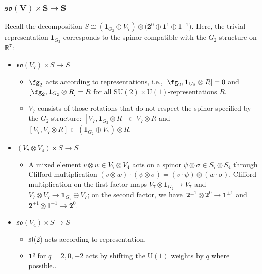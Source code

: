 \documentclass[10pt,a4paper]{amsart}
\numberwithin{equation}{section}
\theoremstyle{definition}
\def\R{\mathbb{R}}
\def\lie#1{\ensuremath{\mathfrak{#1}}}
\def\U{\ensuremath{\mathrm{U}}}
\def\SU{\ensuremath{\mathrm{SU}}}
\begin{document}
\subsubsection[so(V) times S longrightarrow S]{$\boldsymbol{\lie{so}(V) \times S \longrightarrow S}$}
Recall the decomposition
$
 S \cong (\textbf{1}_{G_2} \oplus V_7) \otimes \big(\textbf{2}^0 \oplus \textbf{1}^1 \oplus \textbf{1}^{-1}\big)$.
Here, the trivial representation $\textbf{1}_{G_2}$ corresponds to the spinor compatible with the $G_2$-structure on $\R^7$:
\begin{itemize}\itemsep=0pt
 \item[] \underline{$\lie{so}(V_7) \times S \longrightarrow S$}
 \begin{itemize}\itemsep=0pt
\item[--] $\fg_2$ acts according to representations, i.e., $[\fg_2 , \textbf{1}_{G_2} \otimes R] = 0$ and $[\fg_2 , \textbf{1}_{G_2} \otimes R] = R$ for all $\SU(2) \times \U(1)$-representations $R$.
\item[--] $V_7$ consists of those rotations that do not respect the spinor specified by the $G_2$-structure: $[V_7, \textbf{1}_{G_2} \otimes R] \subset V_7 \otimes R$ and $[V_7, V_7 \otimes R] \subset (\textbf{1}_{G_2} \oplus V_7) \otimes R$.
 \end{itemize}
 \item[] \underline{$(V_7 \otimes V_4) \times S \longrightarrow S$}
 \begin{itemize}\itemsep=0pt
\item[--] A mixed element $v \otimes w \in V_7 \otimes V_4$ acts on a spinor $\psi \otimes \sigma \in S_7 \otimes S_4$ through Clifford multiplication $(v \otimes w) \cdot (\psi \otimes \sigma) = (v \cdot \psi) \otimes (w \cdot \sigma)$. Clifford multiplication on the first factor maps $V_7 \otimes \textbf{1}_{G_2} \longrightarrow V_7$ and $V_7 \otimes V_7 \longrightarrow \textbf{1}_{G_2} \oplus V_7$; on the second factor, we have~${\textbf{2}^{\pm 1} \otimes \textbf{2}^0 \longrightarrow \textbf{1}^{\pm 1}}$ and $\textbf{2}^{\pm 1} \otimes \textbf{1}^{\pm 1} \longrightarrow \textbf{2}^{0}$.
 \end{itemize}
 \item[]\underline{$\lie{so}(V_4) \times S \longrightarrow S$}
 \begin{itemize}\itemsep=0pt
 \item[--] \lie{sl}(2) acts according to representation.
 \item[--] $\textbf{1}^q$ for $q = 2,0,-2$ acts by shifting the $\U(1)$ weights by $q$ where possible..=
 \end{itemize}
\end{itemize}
\end{document}

